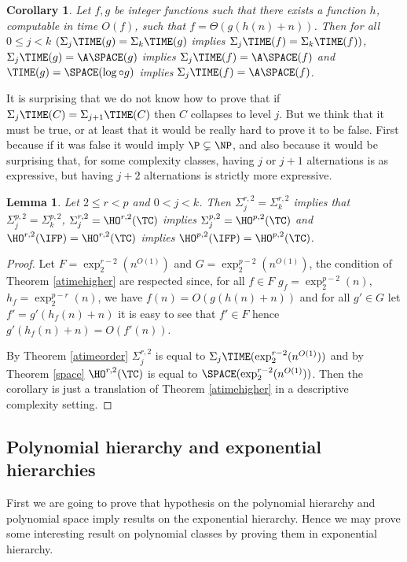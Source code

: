 \documentclass[a4paper,12pt]{article}
\newtheorem{lemma}[theorem]{Lemma}
\newtheorem{corollary}[theorem]{Corollary}
\theoremstyle{definition}
\newcommand{\ATIME}[2]{\ensuremath{\Sigma_{#2}\TIME(#1)}}
\newcommand{\hod}[2]{\ensuremath{\HO^{#1,#2}}}
\newcommand{\hoc}[3]{\ensuremath{\Sigma^{#1,#3}_{#2}}}
\newcommand{\ex}[1]{\ensuremath{\exp_{2}^{#1}(n^{O(1)})}}
\begin{document}
\begin{corollary}
  Let $f,g$ be integer functions such that there exists a function $h$,
  computable in time $O(f)$, such that $f=\Theta(g(h(n)+n))$. Then for
  all $0\le j<k$ $(\ATIME{g}{j}=\ATIME{g}{k}$ implies
  $\ATIME{f}{j}=\ATIME{f}{k})$, $\ATIME{g}{j}=\A\SPACE(g)$ implies
  $\ATIME{f}{j}=\A\SPACE(f)$ and $\TIME(g)=\SPACE(\log\circ g)$ implies
  $\ATIME{f}{j}=\A\SPACE(f)$.
\end{corollary}
It is surprising that we do not know how to prove that if
$\ATIME{C}{j}=\ATIME{C}{j+1}$ then $C$ collapses to level $j$. But we
think that it must be true, or at least that it would be really hard
to prove it to be false. First because if it was false it would imply
$\P\subsetneq\NP$, and also because it would be surprising that, for
some complexity classes, having $j$ or $j+1$ alternations is as
expressive, but having $j+2$ alternations is strictly more expressive.



\begin{lemma}\label{hocollapse}
  Let $2\le r< p$ and $0<j<k$.  Then $\hoc{r}{j}{2}=\hoc{r}{k}{2}$ implies
  that $\hoc{p}{j}{2}=\hoc{p}{k}{2}$, $\hoc rj2=\hod r2(\TC)$  implies
  $\hoc pj2=\hod p2(\TC)$ and  $\hod r2(\IFP)=\hod r2(\TC)$  implies
  $\hod p2(\IFP)=\hod p2(\TC)$.
\end{lemma}
\begin{proof}
  Let $F=\exp^{r-2}_{2}(n^{O(1)})$ and $G=\exp^{p-2}_{2}(n^{O(1)})$,
  the condition of Theorem \ref{atimehigher} are respected since, for
  all $f\in F$ $g_{f}=\exp^{p-2}_{2}(n)$, $h_{f}=\exp_{2}^{p-r}(n)$,
  we have $f(n)=O(g(h(n)+n))$ and for all $g'\in G$ let
  $f'=g'(h_{f}(n)+n)$ it is easy to see that $f'\in F$ hence
  $g'(h_{f}(n)+n)=O(f'(n))$.

  By Theorem \ref{atimeorder} $\hoc{r}{j}{2}$ is equal to
  $\ATIME{\exp_{2}^{r-2}(n^{O(1)})}{j}$ and by Theorem \ref{space}
  $\hod r2(\TC)$ is equal to $\SPACE(\ex {r-2})$. Then the corollary
  is just a translation of Theorem \ref{atimehigher} in a descriptive
  complexity setting.
\end{proof}

\subsection{Polynomial hierarchy and exponential hierarchies}
First we are going to prove that hypothesis on the polynomial
hierarchy and polynomial space imply results on the exponential
hierarchy. Hence we may prove some interesting result on polynomial
classes by proving them in exponential hierarchy.
\end{document}
